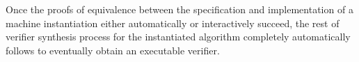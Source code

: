 \documentclass[10pt,conference]{IEEEtran}
\begin{document}
 Once the proofs of equivalence between the specification and implementation of a machine instantiation either automatically or interactively succeed, the rest of verifier synthesis process for the instantiated algorithm completely automatically follows to eventually obtain an executable verifier. 
\end{document}
